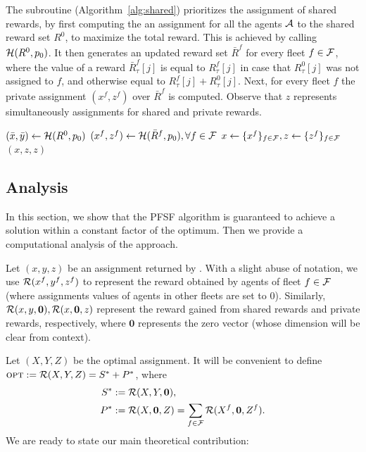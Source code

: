 \documentclass[conference]{IEEEtran}
\begin{document}
The \shared subroutine (Algorithm~\ref{alg:shared}) prioritizes the assignment of shared rewards, by first computing the an assignment for all the agents $\mathcal{A}$ to the shared reward set $R^0$, to maximize the total reward. This is achieved by calling $\mathcal{H}(R^0,p_0)$.  It then generates an updated reward set $\bar{R}^f$ for every fleet $f\in \mathcal{F}$, where the value of a reward $\bar{R}^f_\tau [j]$ is equal to $R^f_\tau [j]$ in case that $R^0_\tau[j]$ was not assigned to $f$, and otherwise equal to $R^f_\tau [j]+R^0_\tau[j]$. Next, for every fleet $f$ the private assignment $(x^f,z^f)$ over $\bar{R}^f$ is computed. Observe that $z$ represents simultaneously assignments for shared and private rewards.

\begin{algorithm}[!ht]
    $(\bar{x},\bar{y})\gets \mathcal{H}(R^0,p_0)$\; 
  $(x^f,z^f)\gets \mathcal{H}(\bar{R}^f,p_0), \forall f\in \mathcal{F}$\;
  $x\gets \{x^f\}_{f\in \mathcal{F}},z\gets\{z^f\}_{f\in \mathcal{F}}$\;
  \Return $(x,z,z)$\;
  \caption{$\shared(\dR,p_0)$}
  \label{alg:shared}
\end{algorithm} 

\subsection{Analysis}
In this section, we show that the PFSF algorithm is guaranteed to achieve a solution within a constant factor of the optimum. Then we provide a computational analysis of the approach.

Let $(x,y,z)$ be an assignment returned by \alg. With a slight abuse of notation, we use $\mathcal{R}(x^f,y^f,z^f)$ to represent the reward obtained by agents of fleet $f\in \mathcal{F}$ (where assignments values of agents in other fleets are set to $0$). Similarly, $\mathcal{R}(x,y,\bm{0}), \mathcal{R}(x,\bm{0},z)$ represent the reward gained from shared rewards and private rewards, respectively, where $\bm{0}$ represents the zero vector (whose dimension will be clear from context). 

Let $(X,Y,Z)$ be the optimal assignment. It will be convenient to define
$\textsc{opt}:=\mathcal{R}(X,Y,Z)=S^*+P^*$, where 
\begin{align*}S^*&:=\mathcal{R}(X,Y,\bm{0}), \\ P^*&:=\mathcal{R}(X,\bm{0},Z)=\sum_{f\in \mathcal{F}}\mathcal{R}({X}^f,\bm{0},{Z}^f).\end{align*}
We are ready to state our main theoretical contribution:
\end{document}
